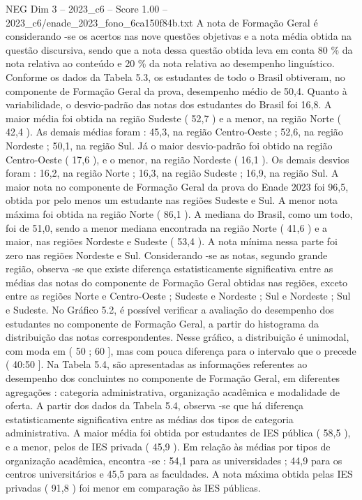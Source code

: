 \begin{textsample}{NEG Dim 3 – 2023\_c6 – Score 1.00 – 2023\_c6/enade\_2023\_fono\_6ca150f84b.txt}
A nota de Formação Geral é considerando -se os acertos nas nove questões objetivas e a nota média obtida na questão discursiva, sendo que a nota dessa questão obtida leva em conta 80 \% da nota relativa ao conteúdo e 20 \% da nota relativa ao desempenho linguístico.
Conforme os dados da Tabela 5.3, os estudantes de todo o Brasil obtiveram, no componente de Formação Geral da prova, desempenho médio de 50,4.
Quanto à variabilidade, o desvio-padrão das notas dos estudantes do Brasil foi 16,8.
A maior média foi obtida na região Sudeste ( 52,7 ) e a menor, na região Norte ( 42,4 ).
As demais médias foram : 45,3, na região Centro-Oeste ; 52,6, na região Nordeste ; 50,1, na região Sul.
Já o maior desvio-padrão foi obtido na região Centro-Oeste ( 17,6 ), e o menor, na região Nordeste ( 16,1 ).
Os demais desvios foram : 16,2, na região Norte ; 16,3, na região Sudeste ; 16,9, na região Sul.
A maior nota no componente de Formação Geral da prova do Enade 2023 foi 96,5, obtida por pelo menos um estudante nas regiões Sudeste e Sul.
A menor nota máxima foi obtida na região Norte ( 86,1 ).
A mediana do Brasil, como um todo, foi de 51,0, sendo a menor mediana encontrada na região Norte ( 41,6 ) e a maior, nas regiões Nordeste e Sudeste ( 53,4 ).
A nota mínima nessa parte foi zero nas regiões Nordeste e Sul.
Considerando -se as notas, segundo grande região, observa -se que existe diferença estatisticamente significativa entre as médias das notas do componente de Formação Geral obtidas nas regiões, exceto entre as regiões Norte e Centro-Oeste ; Sudeste e Nordeste ; Sul e Nordeste ; Sul e Sudeste.
No Gráfico 5.2, é possível verificar a avaliação do desempenho dos estudantes no componente de Formação Geral, a partir do histograma da distribuição das notas correspondentes.
Nesse gráfico, a distribuição é unimodal, com moda em ( 50 ; 60 ], mas com pouca diferença para o intervalo que o precede ( 40:50 ].
Na Tabela 5.4, são apresentadas as informações referentes ao desempenho dos concluintes no componente de Formação Geral, em diferentes agregações : categoria administrativa, organização acadêmica e modalidade de oferta.
A partir dos dados da Tabela 5.4, observa -se que há diferença estatisticamente significativa entre as médias dos tipos de categoria administrativa.
A maior média foi obtida por estudantes de IES pública ( 58,5 ), e a menor, pelos de IES privada ( 45,9 ).
Em relação às médias por tipos de organização acadêmica, encontra -se : 54,1 para as universidades ; 44,9 para os centros universitários e 45,5 para as faculdades.
A nota máxima obtida pelas IES privadas ( 91,8 ) foi menor em comparação às IES públicas.

\end{textsample}
